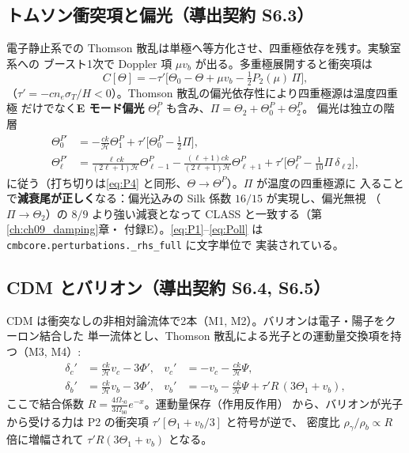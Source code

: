 \subsection{トムソン衝突項と偏光（導出契約 S6.3）}
電子静止系での Thomson 散乱は単極へ等方化させ、四重極依存を残す。実験室系への
ブースト1次で Doppler 項 $\mu v_b$ が出る。多重極展開すると衝突項は
\begin{equation}
  C[\Theta]=-\tau'\Big[\Theta_0-\Theta+\mu v_b-\tfrac{1}{2}P_2(\mu)\,\Pi\Big],
\end{equation}
（$\tau'=-cn_e\sigma_T/H<0$）。Thomson 散乱の偏光依存性により四重極源は温度四重極
だけでなく\textbf{E モード偏光} $\Theta^P_\ell$ も含み、$\Pi=\Theta_2+\Theta^P_0+\Theta^P_2$。
偏光は独立の階層
\begin{align}
  \Theta^{P\prime}_0 &= -\frac{ck}{\mathcal H}\Theta^P_1
    +\tau'\Big[\Theta^P_0-\tfrac12\Pi\Big], \label{eq:Pol0}\\
  \Theta^{P\prime}_\ell &= \frac{\ell\,ck}{(2\ell+1)\mathcal H}\Theta^P_{\ell-1}
    -\frac{(\ell+1)ck}{(2\ell+1)\mathcal H}\Theta^P_{\ell+1}
    +\tau'\Big[\Theta^P_\ell-\tfrac{1}{10}\Pi\,\delta_{\ell2}\Big], \label{eq:Poll}
\end{align}
に従う（打ち切りは\eqref{eq:P4} と同形、$\Theta\to\Theta^P$）。$\Pi$ が温度の四重極源に
入ることで\textbf{減衰尾が正しく}なる：偏光込みの Silk 係数 $16/15$ が実現し、偏光無視
（$\Pi\to\Theta_2$）の $8/9$ より強い減衰となって CLASS と一致する（第\ref{ch:ch09_damping}章・
付録E）。\eqref{eq:P1}--\eqref{eq:Poll} は \texttt{cmbcore.perturbations.\_rhs\_full} に文字単位で
実装されている。

\subsection{CDM とバリオン（導出契約 S6.4, S6.5）}
CDM は衝突なしの非相対論流体で2本（M1, M2）。バリオンは電子・陽子をクーロン結合した
単一流体とし、Thomson 散乱による光子との運動量交換項を持つ（M3, M4）:
\begin{align}
  \delta_c' &= \frac{ck}{\mathcal H}v_c-3\Phi', & v_c' &= -v_c-\frac{ck}{\mathcal H}\Psi, \\
  \delta_b' &= \frac{ck}{\mathcal H}v_b-3\Phi', & v_b' &= -v_b-\frac{ck}{\mathcal H}\Psi
  +\tau'R\,(3\Theta_1+v_b),
\end{align}
ここで結合係数 $R=\frac{4\Omega_{\gamma0}}{3\Omega_{b0}}e^{-x}$。運動量保存（作用反作用）
から、バリオンが光子から受ける力は P2 の衝突項 $\tau'[\Theta_1+v_b/3]$ と符号が逆で、
密度比 $\rho_\gamma/\rho_b\propto R$ 倍に増幅されて $\tau'R(3\Theta_1+v_b)$ となる。

